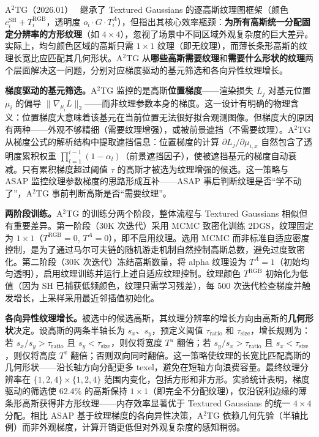 A$^2$TG（2026.01）~\cite{2601_09243} 继承了 Textured Gaussians 的逐高斯纹理图框架（颜色 $c_i^{\text{SH}} + T_i^{\text{RGB}}$，透明度 $o_i \cdot G \cdot T_i^A$），但指出其核心效率瓶颈：\textbf{为所有高斯统一分配固定分辨率的方形纹理}（如 $4 \times 4$），忽视了场景中不同区域外观复杂度的巨大差异。实际上，均匀颜色区域的高斯只需 $1 \times 1$ 纹理（即无纹理），而薄长条形高斯的纹理长宽比应匹配其几何形状。A$^2$TG 从\textbf{哪些高斯需要纹理}和\textbf{需要什么形状的纹理}两个层面解决这一问题，分别对应梯度驱动的基元筛选和各向异性纹理增长。

\textbf{梯度驱动的基元筛选。}A$^2$TG 监控的是高斯\textbf{位置梯度}——渲染损失 $L_j$ 对基元位置 $\mu_i$ 的偏导 $\|\nabla_{\mu_i} L\|_2$——而非纹理参数本身的梯度。这一设计有明确的物理含义：位置梯度大意味着该基元在当前位置无法很好拟合观测图像。但梯度大的原因有两种——外观不够精细（需要纹理增强），或被前景遮挡（不需要纹理）。A$^2$TG 从梯度公式的解析结构中提取遮挡信息：位置梯度的计算 $\partial L_j / \partial \mu_{i,x}$ 自然包含了透明度累积权重 $\prod_{l=1}^{i-1}(1-\alpha_l)$（前景遮挡因子），使被遮挡基元的梯度自动衰减。只有累积梯度超过阈值 $\tau$ 的高斯才被选为纹理增强的候选。这一策略与 ASAP 监控纹理参数梯度的思路形成互补——ASAP 事后判断纹理是否``学不动了''，A$^2$TG 事前判断高斯是否``需要纹理''。

\textbf{两阶段训练。}A$^2$TG 的训练分两个阶段，整体流程与 Textured Gaussians 相似但有重要差异。第一阶段（30K 次迭代）采用 MCMC 致密化训练 2DGS，纹理固定为 $1 \times 1$（$T^{\text{RGB}}=0$, $T^A=0$），即不启用纹理。选用 MCMC 而非标准自适应密度控制，是为了通过马尔可夫链的随机游走机制自然控制高斯总数，避免过度致密化。第二阶段（30K 次迭代）冻结高斯数量，将 alpha 纹理设为 $T^A=1$（初始均匀透明），启用纹理训练并运行上述自适应纹理控制。纹理颜色 $T^{\text{RGB}}$ 初始化为低值（因为 SH 已捕获低频颜色，纹理只需学习残差），每 500 次迭代检查梯度并触发增长，上采样采用最近邻插值初始化。

\textbf{各向异性纹理增长。}被选中的候选高斯，其纹理分辨率的增长方向由高斯的\textbf{几何形状}决定。设高斯的两条半轴长为 $s_x$、$s_y$，预定义阈值 $\tau_{\text{ratio}}$ 和 $\tau_{\text{size}}$，增长规则为：若 $s_x/s_y > \tau_{\text{ratio}}$ 且 $s_y < \tau_{\text{size}}$，则仅将宽度 $T^u$ 翻倍；若 $s_y/s_x > \tau_{\text{ratio}}$ 且 $s_x < \tau_{\text{size}}$，则仅将高度 $T^v$ 翻倍；否则双向同时翻倍。这一策略使纹理的长宽比匹配高斯的几何形状——沿长轴方向分配更多 texel，避免在短轴方向浪费容量。最终纹理分辨率在 $\{1,2,4\} \times \{1,2,4\}$ 范围内变化，包括方形和非方形。实验统计表明，梯度驱动的筛选使 62.4\% 的高斯保持 $1 \times 1$（即完全不分配纹理），仅沿锐利边缘的薄条形高斯获得非方形纹理——内存效率显著优于 Textured Gaussians 的统一 $4 \times 4$ 分配。相比 ASAP 基于纹理梯度的各向异性决策，A$^2$TG 依赖几何先验（半轴比例）而非外观梯度，计算开销更低但对外观复杂度的感知稍弱。

